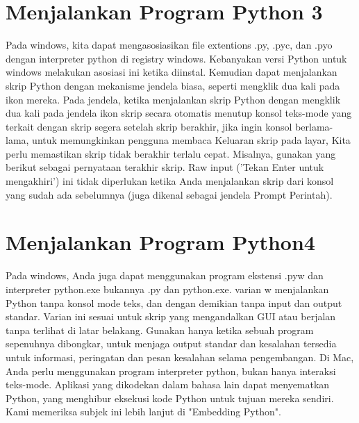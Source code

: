 \documentclass[12pt, times new roman, a4paper]{article}
\begin{document}
\section{Menjalankan Program Python 3}
Pada windows, kita dapat mengasosiasikan file extentions .py, .pyc, dan .pyo dengan interpreter python di registry windows. Kebanyakan versi Python untuk windows melakukan asosiasi ini ketika diinstal. Kemudian dapat menjalankan skrip Python dengan mekanisme jendela biasa, seperti mengklik dua kali pada ikon mereka. Pada jendela, ketika menjalankan skrip Python dengan mengklik dua kali pada jendela ikon skrip secara otomatis menutup konsol teks-mode yang terkait dengan skrip segera setelah skrip berakhir, jika ingin konsol berlama-lama, untuk memungkinkan pengguna membaca Keluaran skrip pada layar, Kita perlu memastikan skrip tidak berakhir terlalu cepat. Misalnya, gunakan yang berikut sebagai pernyataan terakhir skrip. Raw input ('Tekan Enter untuk mengakhiri') ini tidak diperlukan ketika Anda menjalankan skrip dari konsol yang sudah ada sebelumnya (juga dikenal sebagai jendela Prompt Perintah).

\section{Menjalankan Program Python4}
Pada windows, Anda juga dapat menggunakan program ekstensi .pyw dan interpreter python.exe bukannya .py dan python.exe. varian w menjalankan Python tanpa konsol mode teks, dan dengan demikian tanpa input dan output standar. Varian ini sesuai untuk skrip yang mengandalkan GUI atau berjalan tanpa terlihat di latar belakang. Gunakan hanya ketika sebuah program sepenuhnya dibongkar, untuk menjaga output standar dan kesalahan tersedia untuk informasi, peringatan dan pesan kesalahan selama pengembangan. Di Mac, Anda perlu menggunakan program interpreter python, bukan hanya interaksi teks-mode. Aplikasi yang dikodekan dalam bahasa lain dapat menyematkan Python, yang menghibur eksekusi kode Python untuk tujuan mereka sendiri. Kami memeriksa subjek ini lebih lanjut di "Embedding Python".
\end{document}
